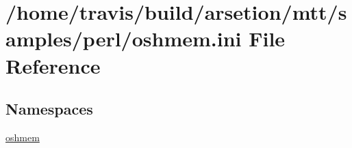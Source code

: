 \hypertarget{oshmem_8ini}{\section{/home/travis/build/arsetion/mtt/samples/perl/oshmem.ini File Reference}
\label{oshmem_8ini}
}
\subsection*{Namespaces}
\begin{DoxyCompactItemize}
\item 
\hyperlink{namespaceoshmem}{oshmem}
\end{DoxyCompactItemize}
